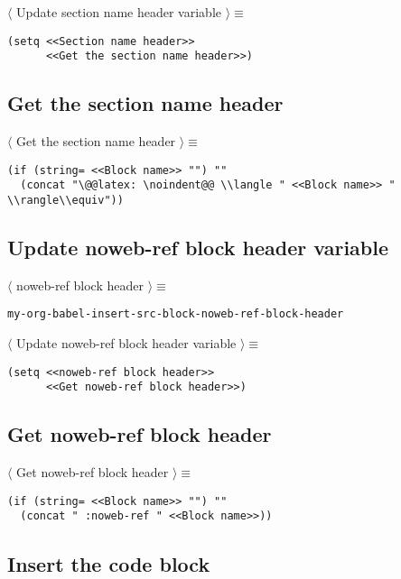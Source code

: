 \documentclass[11pt]{article}
\begin{document}
 \noindent \(\langle\) Update section name header variable \(\rangle \equiv\)
\begin{verbatim}
(setq <<Section name header>>
      <<Get the section name header>>)
\end{verbatim}

\subsection{Get the section name header}
\label{sec:org7d88a09}

 \noindent \(\langle\) Get the section name header \(\rangle \equiv\)
\begin{verbatim}
(if (string= <<Block name>> "") ""
  (concat "\@@latex: \noindent@@ \\langle " <<Block name>> " \\rangle\\equiv"))
\end{verbatim}

\subsection{Update noweb-ref block header variable}
\label{sec:org1ff9cac}

 \noindent \(\langle\) noweb-ref block header \(\rangle \equiv\)
\begin{verbatim}
my-org-babel-insert-src-block-noweb-ref-block-header
\end{verbatim}

 \noindent \(\langle\) Update noweb-ref block header variable \(\rangle \equiv\)
\begin{verbatim}
(setq <<noweb-ref block header>>
      <<Get noweb-ref block header>>)
\end{verbatim}

\subsection{Get noweb-ref block header}
\label{sec:orgf6c2155}

 \noindent \(\langle\) Get noweb-ref block header \(\rangle \equiv\)
\begin{verbatim}
(if (string= <<Block name>> "") ""
  (concat " :noweb-ref " <<Block name>>))
\end{verbatim}

\subsection{Insert the code block}
\label{sec:org809328b}
\end{document}
